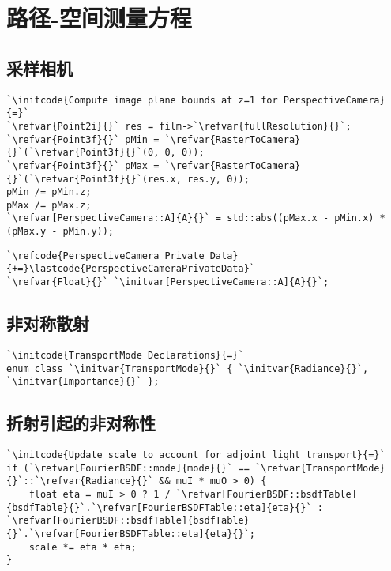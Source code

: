 \section{路径-空间测量方程}\label{sec:路径-空间测量方程}

\subsection{采样相机}\label{sub:采样相机2}
\begin{lstlisting}
`\initcode{Compute image plane bounds at z=1 for PerspectiveCamera}{=}`
`\refvar{Point2i}{}` res = film->`\refvar{fullResolution}{}`;
`\refvar{Point3f}{}` pMin = `\refvar{RasterToCamera}{}`(`\refvar{Point3f}{}`(0, 0, 0));
`\refvar{Point3f}{}` pMax = `\refvar{RasterToCamera}{}`(`\refvar{Point3f}{}`(res.x, res.y, 0));
pMin /= pMin.z;
pMax /= pMax.z;
`\refvar[PerspectiveCamera::A]{A}{}` = std::abs((pMax.x - pMin.x) * (pMax.y - pMin.y));
\end{lstlisting}
\begin{lstlisting}
`\refcode{PerspectiveCamera Private Data}{+=}\lastcode{PerspectiveCameraPrivateData}`
`\refvar{Float}{}` `\initvar[PerspectiveCamera::A]{A}{}`;
\end{lstlisting}
\subsection{非对称散射}\label{sub:非对称散射}
\begin{lstlisting}
`\initcode{TransportMode Declarations}{=}`
enum class `\initvar{TransportMode}{}` { `\initvar{Radiance}{}`, `\initvar{Importance}{}` };
\end{lstlisting}


\subsection{折射引起的非对称性}\label{sub:折射引起的非对称性}
\begin{lstlisting}
`\initcode{Update scale to account for adjoint light transport}{=}`
if (`\refvar[FourierBSDF::mode]{mode}{}` == `\refvar{TransportMode}{}`::`\refvar{Radiance}{}` && muI * muO > 0) {
    float eta = muI > 0 ? 1 / `\refvar[FourierBSDF::bsdfTable]{bsdfTable}{}`.`\refvar[FourierBSDFTable::eta]{eta}{}` : `\refvar[FourierBSDF::bsdfTable]{bsdfTable}{}`.`\refvar[FourierBSDFTable::eta]{eta}{}`;
    scale *= eta * eta;
}
\end{lstlisting}